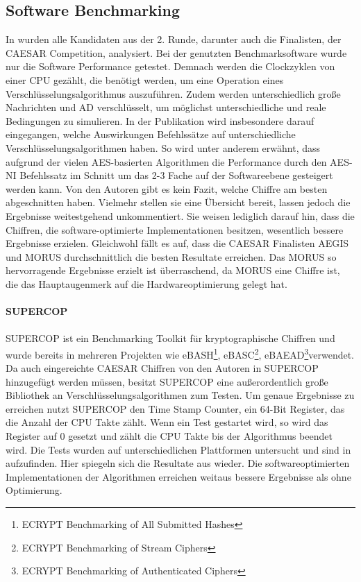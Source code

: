\subsection{Software Benchmarking}
\label{sec:software benchmarking}
In \cite{Ankele2016SoftwareBO}
wurden alle Kandidaten aus der 2. Runde, darunter auch die Finalisten, der \gls{CAESAR} Competition, analysiert. Bei der genutzten Benchmarksoftware wurde nur die Software Performance getestet. Demnach werden die Clockzyklen von einer \gls{CPU} gezählt, die benötigt werden, um eine Operation eines Verschlüsselungsalgorithmus auszuführen. Zudem werden unterschiedlich große Nachrichten und \gls{AD} verschlüsselt, um möglichst unterschiedliche und reale Bedingungen zu simulieren. 
In der Publikation wird insbesondere darauf eingegangen, welche Auswirkungen Befehlssätze auf unterschiedliche Verschlüsselungsalgorithmen haben. So wird unter anderem erwähnt, dass aufgrund der vielen \gls{AES}-basierten Algorithmen die Performance durch den \gls{AES-NI} Befehlssatz im Schnitt um das 2-3 Fache auf der Softwareebene gesteigert werden kann.
Von den Autoren gibt es kein Fazit, welche Chiffre am besten abgeschnitten haben. Vielmehr stellen sie eine Übersicht bereit, lassen jedoch die Ergebnisse weitestgehend  unkommentiert. Sie weisen lediglich darauf hin, dass die Chiffren, die software-optimierte Implementationen besitzen, wesentlich bessere Ergebnisse erzielen. Gleichwohl fällt es auf, dass die \gls{CAESAR} Finalisten AEGIS und MORUS durchschnittlich die besten Resultate erreichen. Das MORUS so hervorragende Ergebnisse erzielt ist überraschend, da MORUS eine Chiffre ist, die das Hauptaugenmerk auf die Hardwareoptimierung gelegt hat.
\\
\\
\textbf{SUPERCOP}\\
\\
\gls{SUPERCOP} ist ein Benchmarking Toolkit für kryptographische Chiffren und wurde bereits in mehreren Projekten wie eBASH\footnote[5]{ECRYPT Benchmarking of All Submitted Hashes}, eBASC\footnote[6]{ECRYPT Benchmarking of Stream Ciphers}, eBAEAD\footnote[7]{ECRYPT Benchmarking of Authenticated Ciphers}verwendet. Da auch eingereichte \gls{CAESAR} Chiffren von den Autoren in SUPERCOP hinzugefügt werden müssen, besitzt SUPERCOP eine außerordentlich große Bibliothek an Verschlüsselungsalgorithmen zum Testen\cite{bernstein2009supercop}. Um genaue Ergebnisse zu erreichen nutzt SUPERCOP den Time Stamp Counter, ein 64-Bit Register, das die Anzahl der \gls{CPU} Takte zählt. Wenn ein Test gestartet wird, so wird das Register auf 0 gesetzt und zählt die CPU Takte bis der Algorithmus beendet wird. Die Tests wurden auf unterschiedlichen Plattformen untersucht und sind in \cite{CryptoList} aufzufinden.
Hier spiegeln sich die Resultate aus\cite{Ankele2016SoftwareBO} wieder. Die softwareoptimierten Implementationen der Algorithmen erreichen weitaus bessere Ergebnisse als ohne Optimierung.


